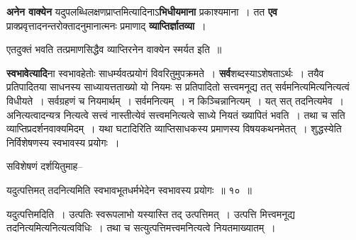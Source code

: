 \documentclass[article,12pt,a4paper]{memoir}
\begin{document}
	  \pstart \textbf{अनेन वाक्येन} यदुपलब्धिलक्षणप्राप्तमित्यादिनाऽ\textbf{भिधीयमाना} प्रकाश्यमाना । तत \textbf{एव} प्राक्प्रवृत्तादनन्तरोक्तादनुमानात्मनः प्रमाणाद् \textbf{व्याप्तिर्ज्ञातव्या} ।
	\pend
      

	  \pstart एतदुक्तं भवति तत्प्रमाणसिद्धैव व्याप्तिरनेन वाक्येन स्मर्यत इति ॥
	\pend
      

	  \pstart \textbf{स्वभावेत्यादि}ना स्वभावहेतोः साधर्म्यवत्प्रयोगं विवरितुमुपक्रमते । \textbf{सर्व}शब्दस्याऽशेषताऽर्थः । तयैव प्रतिपादितया साधनस्य साध्यायत्तताख्यो यो नियमः स प्रतिपादितो  \leavevmode{} सत्त्वमनूद्य तत् सर्वमनित्यमित्यनित्यत्वं विधीयते । सर्वग्रहणं च नियमार्थम् । सर्वमनित्यम् । न किञ्चिन्नानित्यम् । यत् सत् तदनित्यमेव । अनित्यत्वादन्यत्र नित्यत्वे सत्त्वं नास्तीत्येवं सत्त्वमनित्यत्वे साध्ये नियतं ख्यापितं भवति । तथा च सति व्याप्तिप्रदर्शनवाक्यमिदम् । यथा घटादिरिति व्याप्तिसाधकस्य प्रमाणस्य विषयकथनमेतत् । शुद्धस्येति निर्विशेषणस्य स्वभावस्य प्रयोगः ।
	\pend
      

	  \pstart सविशेषणं दर्शयितुमाह--
	\pend
      
	  \bigskip
	  \begingroup
	

	  \pstart यदुत्पत्तिमत् तदनित्यमिति स्वभावभूतधर्मभेदेन स्वभावस्य प्रयोगः ॥ १० ॥
	\pend
      
	  \endgroup
	
	  \bigskip
	  \begingroup
	

	  \pstart यदुत्पत्तिमदिति । उत्पतिः स्वरूपलाभो यस्यास्ति तद् उत्पत्तिमत् । उत्पत्ति मित्त्वमनूद्य तदनित्यमित्यनित्यत्वविधिः । तथा च सत्युत्पत्तिमत्त्वमनित्यत्वे नियतमाख्यातम् ।
	\pend
        
\end{document}
